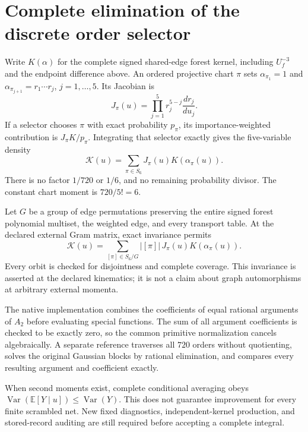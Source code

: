 \documentclass[11pt]{article}
\begin{document}
\section{Complete elimination of the discrete order selector}
Write $K(\alpha)$ for the complete signed shared-edge forest kernel,
including $U_f^{-3}$ and the endpoint difference above. An ordered
projective chart $\pi$ sets $\alpha_{\pi_1}=1$ and
$\alpha_{\pi_{j+1}}=r_1\cdots r_j$, $j=1,\ldots,5$. Its Jacobian is
\[
 J_\pi(u)=\prod_{j=1}^{5} r_j^{5-j}\frac{dr_j}{du_j}.
\]
If a selector chooses $\pi$ with exact probability $p_\pi$, its
importance-weighted contribution is $J_\pi K/p_\pi$. Integrating that
selector exactly gives the five-variable density
\[
 \mathcal K(u)=\sum_{\pi\in S_6}J_\pi(u)K(\alpha_\pi(u)).
\]
There is no factor $1/720$ or $1/6$, and no remaining probability
divisor. The constant chart moment is $720/5!=6$.

Let $G$ be a group of edge permutations preserving the entire signed
forest polynomial multiset, the weighted edge, and every transport
table. At the declared external Gram matrix, exact invariance permits
\[
 \mathcal K(u)=\sum_{[\pi]\in S_6/G}|[\pi]|\,
 J_\pi(u)K(\alpha_\pi(u)).
\]
Every orbit is checked for disjointness and complete coverage. This
invariance is asserted at the declared kinematics; it is not a claim
about graph automorphisms at arbitrary external momenta.

The native implementation combines the coefficients of equal rational
arguments of $A_2$ before evaluating special functions. The sum of all
argument coefficients is checked to be exactly zero, so the common
primitive normalization cancels algebraically. A separate reference
traverses all $720$ orders without quotienting, solves the original
Gaussian blocks by rational elimination, and compares every resulting
argument and coefficient exactly.

When second moments exist, complete conditional averaging obeys
$\operatorname{Var}(\mathbb E[Y\mid u])\leq\operatorname{Var}(Y)$.
This does not guarantee improvement for every finite scrambled net.
New fixed diagnostics, independent-kernel production, and stored-record
auditing are still required before accepting a complete integral.
\end{document}
